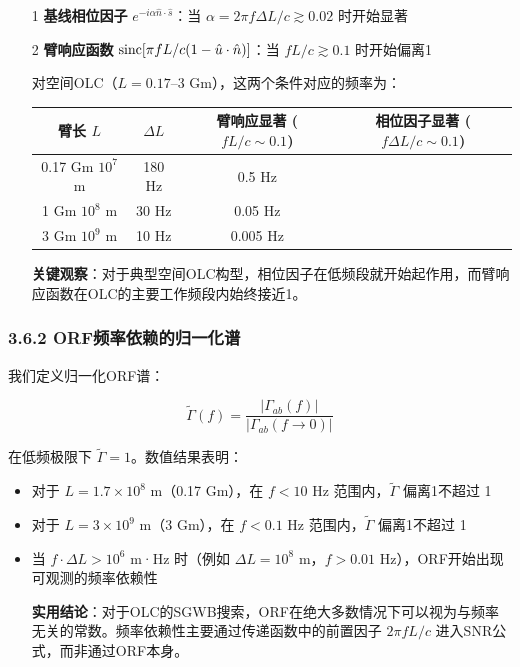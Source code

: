 \documentclass[12pt,a4paper]{article}
\begin{document}
\begin{itemize}
  \item[1] \textbf{基线相位因子} $e^{-i\alpha \hat{n}\cdot\hat{s}}$：当 $\alpha = 2\pi f \Delta L / c \gtrsim 0.02$ 时开始显著
  \item[2] \textbf{臂响应函数} ${\rm sinc}[\pi f L/c(1-\hat{u}\cdot\hat{n})]$：当 $fL/c \gtrsim 0.1$ 时开始偏离1

对空间OLC（$L = 0.17$–3 Gm），这两个条件对应的频率为：

\begin{tabular}{|c|c|c|c|}
\hline
臂长 $L$ & $\Delta L$ & \shortstack{臂响应显著 \\ ($fL/c \sim 0.1$)} & \shortstack{相位因子显著 \\ ($f\Delta L/c \sim 0.1$)} \\
\hline
0.17 Gm $10^{7}$ m & 180 Hz & 0.5 Hz & \\
1 Gm $10^{8}$ m & 30 Hz & 0.05 Hz & \\
3 Gm $10^{9}$ m & 10 Hz & 0.005 Hz & \\
\hline
\end{tabular}


\textbf{关键观察}：对于典型空间OLC构型，相位因子在低频段就开始起作用，而臂响应函数在OLC的主要工作频段内始终接近1。

\end{itemize}
\subsubsection{3.6.2 ORF频率依赖的归一化谱}


我们定义归一化ORF谱：

$$\tilde{\Gamma}(f) = \frac{|\Gamma_{ab}(f)|}{|\Gamma_{ab}(f \to 0)|}$$

在低频极限下 $\tilde{\Gamma} = 1$。数值结果表明：

\begin{itemize}
  \item 对于 $L = 1.7 \times 10^8$ m（0.17 Gm），在 $f < 10$ Hz 范围内，$\tilde{\Gamma}$ 偏离1不超过 1%
  \item 对于 $L = 3 \times 10^9$ m（3 Gm），在 $f < 0.1$ Hz 范围内，$\tilde{\Gamma}$ 偏离1不超过 1%
  \item 当 $f \cdot \Delta L > 10^6$ m·Hz 时（例如 $\Delta L = 10^8$ m，$f > 0.01$ Hz），ORF开始出现可观测的频率依赖性

\textbf{实用结论}：对于OLC的SGWB搜索，ORF在绝大多数情况下可以视为与频率无关的常数。频率依赖性主要通过传递函数中的前置因子 $2\pi f L/c$ 进入SNR公式，而非通过ORF本身。

\end{itemize}
\end{document}
